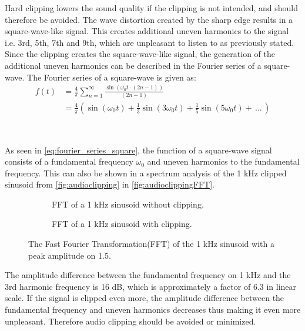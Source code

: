 Hard clipping lowers the sound quality if the clipping is not intended, and should therefore be avoided. The wave distortion created by the sharp edge results in a square-wave-like signal. This creates additional uneven harmonics to the signal i.e. 3rd, 5th, 7th and 9th, which are unpleasant to listen to as previously stated. Since the clipping creates the square-wave-like signal, the generation of the additional uneven harmonics can be described in the Fourier series of a square-wave. The Fourier series of a square-wave is given as:
\begin{align}\label{eq:fourier_series_square}
f(t) &= \frac{4}{\pi} \sum_{n=1}^{\infty} \frac{\sin (\omega_0 t \cdot (2n-1))}{(2n-1)} \\
	 &= \frac{4}{\pi} (\sin(\omega_0 t) + \frac{1}{3}\sin(3 \omega_0 t) + \frac{1}{5}\sin(5 \omega_0 t) + \, ... \,)
\end{align}
\begin{where}
\\
\end{where}

As seen in \autoref{eq:fourier_series_square}, the function of a square-wave signal consists of a fundamental frequency $\omega_0$ and uneven harmonics to the fundamental frequency. This can also be shown in a spectrum analysis of the 1 kHz clipped sinusoid from \autoref{fig:audioclipping} in \autoref{fig:audioclippingFFT}.

\begin{figure}[H]
\centering
\begin{subfigure}[t]{0.47\textwidth}
	
	\caption{FFT of a 1 kHz sinusoid without clipping.}
	\label{fig:clippingCleanFFT}
\end{subfigure}
\hspace{6mm} 
\begin{subfigure}[t]{0.47\textwidth}
	
	\caption{FFT of a 1 kHz sinusoid with clipping.}
	\label{fig:clippingDistFFT}
\end{subfigure}
\caption{The Fast Fourier Transformation(FFT) of the 1 kHz sinusoid with a peak amplitude on 1.5. }
\label{fig:audioclippingFFT}
\end{figure}

The amplitude difference between the fundamental frequency on 1 kHz and the 3rd harmonic frequency is 16 dB, which is approximately a factor of 6.3 in linear scale. If the signal is clipped even more, the amplitude difference between the fundamental frequency and uneven harmonics decreases thus making it even more unpleasant. Therefore audio clipping should be avoided or minimized.










